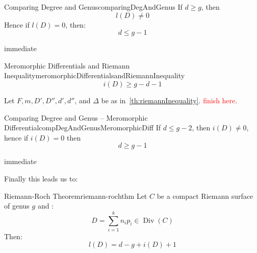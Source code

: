 \documentclass{book}
\newcommand{\Div}{{\operatorname{Div}}}
\begin{document}
\begin{cor}{Comparing Degree and Genus}{comparingDegAndGenus}
  If $d \ge g$, then
  \[
    l(D) \ne 0
  \]
  Hence if $l(D) = 0$, then:
  \[
    d \le g-1
  \]
\end{cor}

\begin{Proof}
  immediate
\end{Proof}

\begin{prop}{Meromorphic Differentials and Riemann Inequality}{meromorphicDifferentialsandRiemannInequality}
  \[
    i(D) \ge g-d-1
  \]
\end{prop}

\begin{Proof}
  Let $F,m,D', D'', d', d''$, and $\Delta$ be as in~\cref{th:riemannInequality}. \textcolor{red}{finish here}.
\end{Proof}

\begin{cor}{Comparing Degree and Genus -- Meromorphic Differential}{compDegAndGenusMeromorphicDiff}
  If $d \le g-2$, then $i(D) \ne 0$, hence if $i(D) = 0$ then
  \[
    d \ge g-1
  \]
\end{cor}

\begin{Proof}
  immediate
\end{Proof}

Finally this leads us to:

\begin{thm}{Riemann-Roch Theorem}{riemann-rochthm}
  Let $C$ be a compact Riemann surface of genus $g$ and :
  \[
    D = \sum_{i=1}^k n_ip_i \in \Div(C)
  \]
  Then:
  \[
    l(D) = d-g+i(D) +1
  \]
\end{thm}
\end{document}

